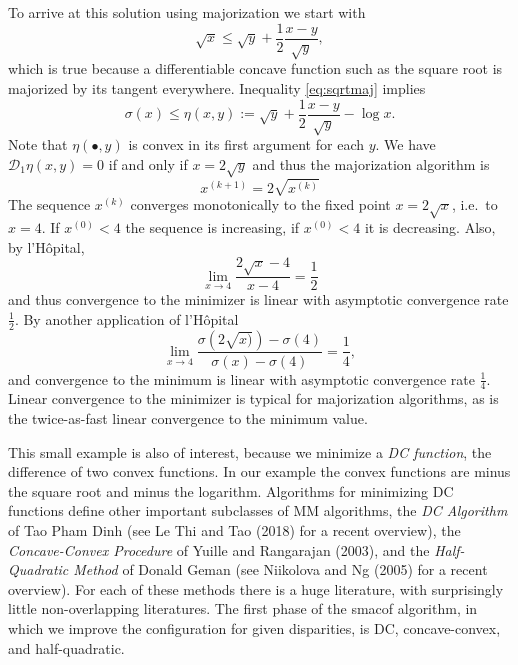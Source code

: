 \documentclass[
  12pt,
]{article}
\begin{document}
To arrive at this solution using majorization we start with
\begin{equation}
\sqrt{x}\leq\sqrt{y}+\frac12\frac{x-y}{\sqrt{y}},
\label{eq:sqrtmaj}
\end{equation} which is true because a differentiable concave function
such as the square root is majorized by its tangent everywhere.
Inequality \eqref{eq:sqrtmaj} implies \begin{equation}
\sigma(x)\leq\eta(x,y):=\sqrt{y}+\frac12\frac{x-y}{\sqrt{y}}-\log{x}.
\label{eq:examplemaj}
\end{equation} Note that \(\eta(\bullet,y)\) is convex in its first
argument for each \(y\). We have \(\mathcal{D}_1\eta(x,y)=0\) if and only if
\(x=2\sqrt{y}\) and thus the majorization algorithm is \begin{equation}
x^{(k+1)}=2\sqrt{x^{(k)}}
\label{eq:examplealg}
\end{equation} The sequence \(x^{(k)}\) converges monotonically to the
fixed point \(x=2\sqrt{x}\), i.e.~to \(x=4\). If \(x^{(0)}<4\) the sequence is
increasing, if \(x^{(0)}<4\) it is decreasing. Also, by l'Hôpital,
\begin{equation}
\lim_{x\rightarrow 4}\frac{2\sqrt{x}-4}{x-4}=\frac12
\label{eq:hopi1}
\end{equation} and thus convergence to the minimizer is linear with
asymptotic convergence rate \(\frac12\). By another application of
l'Hôpital \begin{equation}
\lim_{x\rightarrow 4}\frac{\sigma(2\sqrt{x)})-\sigma(4)}{\sigma(x)-\sigma(4)}=\frac14,
\label{eq:hopi2}
\end{equation} and convergence to the minimum is linear with asymptotic
convergence rate \(\frac14\). Linear convergence to the minimizer is
typical for majorization algorithms, as is the twice-as-fast linear
convergence to the minimum value.

This small example is also of interest, because we minimize a \emph{DC
function}, the difference of two convex functions. In our example the
convex functions are minus the square root and minus the logarithm.
Algorithms for minimizing DC functions define other important subclasses
of MM algorithms, the \emph{DC Algorithm} of Tao Pham Dinh (see Le Thi and Tao (2018)
for a recent overview), the \emph{Concave-Convex Procedure} of
Yuille and Rangarajan (2003), and the \emph{Half-Quadratic Method} of Donald Geman
(see Niikolova and Ng (2005) for a recent overview). For each of these methods
there is a huge literature, with surprisingly little non-overlapping
literatures. The first phase of the smacof algorithm, in which we
improve the configuration for given disparities, is DC, concave-convex,
and half-quadratic.
\end{document}
